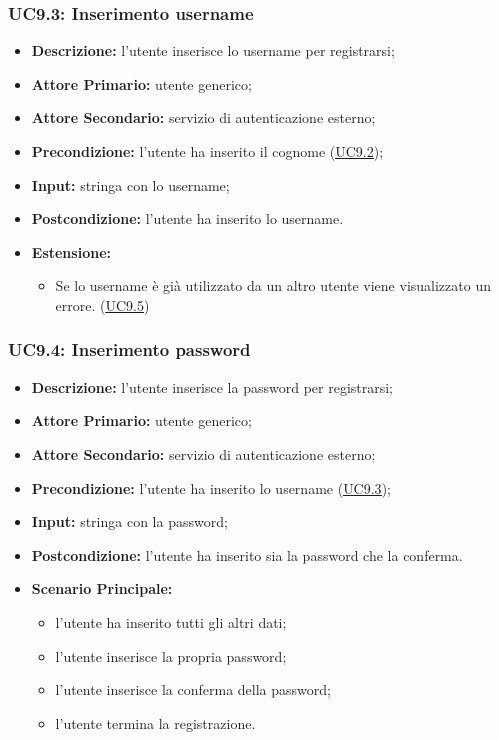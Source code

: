 \subsubsection{UC9.3: Inserimento username}
\label{sec:UC9.3}
\begin{itemize}
    \item \textbf{Descrizione:} l'utente inserisce lo username per registrarsi;
    \item \textbf{Attore Primario:} utente generico;
    \item \textbf{Attore Secondario:} servizio di autenticazione esterno;
    \item \textbf{Precondizione:} l'utente ha inserito il cognome (\hyperref[sec:UC9.2]{\underline{UC9.2}});
    \item \textbf{Input:} stringa con lo username;
    \item \textbf{Postcondizione:} l'utente ha inserito lo username.
    \item \textbf{Estensione:}
          \begin{itemize}
              \item Se lo username è già utilizzato da un altro utente viene visualizzato un errore. (\hyperref[sec:UC9.5]{\underline{UC9.5}})
          \end{itemize}
\end{itemize}

\subsubsection{UC9.4: Inserimento password}
\label{sec:UC9.4}
\begin{itemize}
    \item \textbf{Descrizione:} l'utente inserisce la password per registrarsi;
    \item \textbf{Attore Primario:} utente generico;
    \item \textbf{Attore Secondario:} servizio di autenticazione esterno;
    \item \textbf{Precondizione:} l'utente ha inserito lo username (\hyperref[sec:UC9.3]{\underline{UC9.3}});
    \item \textbf{Input:} stringa con la password;
    \item \textbf{Postcondizione:} l'utente ha inserito sia la password che la conferma.
    \item \textbf{Scenario Principale:}
          \begin{itemize}
              \item l'utente ha inserito tutti gli altri dati;
              \item l'utente inserisce la propria password;
              \item l'utente inserisce la conferma della password;
              \item l'utente termina la registrazione.
          \end{itemize}
\end{itemize}

